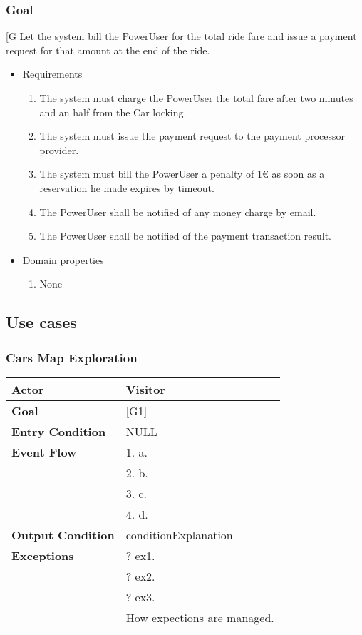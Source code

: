     \subsubsection{Goal }
    {[}G\arabic{goalctr}{]}
    Let the system bill the PowerUser for the total ride fare and issue a payment request for that amount at the end of the ride.
    \begin{itemize}
        \item Requirements
        \begin{enumerate}[REQ]
    			\item The system must charge the PowerUser the total fare after two minutes and an half from the Car locking.
    			\item The system must issue the payment request to the payment processor provider.	
    			\item The system must bill the PowerUser a penalty of 1$\euro$ as soon as a reservation he made expires by timeout.
    			\item The PowerUser shall be notified of any money charge by email.
    			\item The PowerUser shall be notified of the payment transaction result.
        \end{enumerate}
        \item Domain properties
        \begin{enumerate}[PRO]
    			\item None
        \end{enumerate}
    \end{itemize}


\subsection{Use cases}


\subsubsection{Cars Map Exploration}
\begin{tabular}{| l | p{8cm} |}
\hline
\textbf{Actor}      &       Visitor \\
\hline
\textbf{Goal}       &       [G1]\\
\hline
\textbf{Entry Condition} &  NULL\\
\hline
\textbf{Event Flow}     &   1.	a.\\&
                                            2.	b.\\&
                                            3.	c.\\&
                                            4.  d.\\
\hline
\textbf{Output Condition} & conditionExplanation\\
\hline
\textbf{Exceptions} &       ?   ex1.\\& 
                            ?	ex2.\\&
                            ?	ex3.\\& 
                           How expections are managed.\\
\hline
\end{tabular} 

